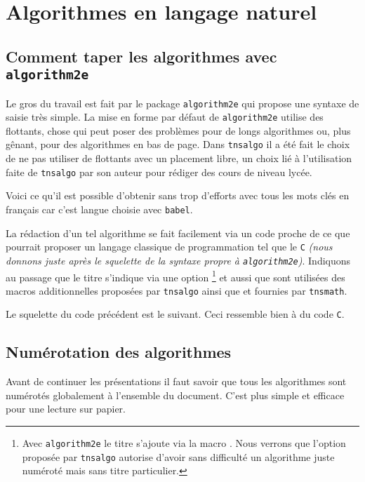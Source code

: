 \documentclass[12pt,a4paper]{article}
\begin{document}
\newpage

\section{Algorithmes en langage naturel}

\subsection{Comment taper les algorithmes avec \texttt{algorithm2e}}

Le gros du travail est fait par le package \verb#algorithm2e# qui propose une syntaxe de saisie très simple.
La mise en forme par défaut de \verb#algorithm2e# utilise des flottants, chose qui peut poser des problèmes pour de longs algorithmes ou, plus gênant, pour des algorithmes en bas de page.
Dans \verb#tnsalgo# il a été fait le choix de ne pas utiliser de flottants avec un placement libre, un choix lié à l'utilisation faite de \verb#tnsalgo# par son auteur pour rédiger des cours de niveau lycée. 


\medskip


Voici ce qu'il est possible d'obtenir sans trop d'efforts avec tous les mots clés en français car c'est langue choisie avec \verb#babel#.


\bigskip

\bigskip


La rédaction d'un tel algorithme se fait facilement via un code proche de ce que pourrait proposer un langage classique de programmation tel que le \Verb#C# \emph{(nous donnons juste après le squelette de la syntaxe propre à \texttt{algorithm2e})}.
Indiquons au passage que le titre s'indique via une option
\footnote{
	Avec \texttt{algorithm2e} le titre s'ajoute via la macro .
	Nous verrons que l'option proposée par \texttt{tnsalgo} autorise d'avoir sans difficulté un algorithme juste numéroté mais sans titre particulier.
}
et aussi que sont utilisées des macros additionnelles proposées par \verb#tnsalgo# ainsi que  et  fournies par \verb#tnsmath#.




Le squelette du code précédent est le suivant. Ceci ressemble bien à du code \verb#C#. 


\begin{latexex-alone}
\caption{...}


\end{latexex-alone}




\subsection{Numérotation des algorithmes}

Avant de continuer les présentations il faut savoir que tous les algorithmes sont numérotés globalement à l'ensemble du document. C'est plus simple et efficace pour une lecture sur papier.
\end{document}
